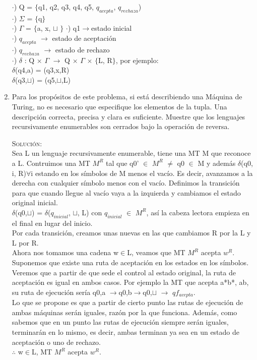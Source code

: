 \documentclass[letterpaper,10pt]{article}
\begin{document}
\begin{enumerate}
	$\cdot$) Q = $\lbrace$q1, q2, q3, q4, q5, $q_{acepta}$, $q_{rechaza}$)\\
	$\cdot$) $\Sigma$ = $\lbrace$q$\rbrace$\\
	$\cdot$) $\Gamma$ = $\lbrace$a, x, $\sqcup$ $\rbrace$
	$\cdot$) q1$\rightarrow$estado inicial\\
	$\cdot$) $q_{acepta}$ $\rightarrow$ estado de aceptación\\
	$\cdot$)  $q_{rechaza}$ $\rightarrow$ estado de rechazo\\
	$\cdot$) $\delta$ : Q $\times$ $\Gamma$ $\rightarrow$ Q $\times$ $\Gamma$ $\times$ $\lbrace$L, R$\rbrace$, por ejemplo:\\
	$\delta$(q4,a) = (q3,x,R)\\
	$\delta$(q3,$\sqcup$) = (q5,$\sqcup$,L)
	
	
    \item Para los propósitos de este problema, si está describiendo una Máquina de Turing, no
es necesario que especifique los elementos de la tupla. Una descripción correcta, precisa y clara es
suficiente. Muestre que los lenguajes recursivamente enumerables son cerrados bajo la operación de
reversa.

    \textsc{Solución:}
    \\
    Sea L un lenguaje recursivamente enumerable, tiene una MT M que reconoce a L. Contruimos una MT $M^{R}$ tal que q0' $\in$ $M^{R}$ $\neq$ q0 $\in$ M y además $\delta$(q0, i, R)$\forall$i estando en los símbolos de M menos el vacío. Es decir, avanzamos a la derecha con cualquier símbolo menos con el vacío.
    Definimos la transición para que cuando llegue al vacío vaya a la izquierda y cambiamos el estado original inicial.\\
    $\delta$(q0,$\sqcup$) = $\delta$($q_{inicial}$, $\sqcup$, L) con $q_{inicial}$ $\in$ $M^{R}$, así la cabeza lectora empieza en el final en lugar del inicio.\\
    Por cada transición, creamos unas nuevas en las que cambiamos R por la L y L por R.\\
    Ahora nos tomamos una cadena w$\in$L, veamos que MT $M^{R}$ acepta $w^{R}$. Suponemos que existe una ruta de aceptación en los estados en los símbolos. Veremos que a partir de que sede el control al estado original, la ruta de aceptación es igual en ambos casos. Por ejemplo la MT que acepta a*b*, ab, su ruta de ejecución sería q0,a $\rightarrow$q0,b$\rightarrow$q0,$\sqcup$ $\rightarrow$ $qf_{acepta}$.\\
    Lo que se propone es que a partir de cierto punto las rutas de ejecución de ambas máquinas serán iguales, razón por la que funciona. Además, como sabemos que en un punto las rutas de ejecución siempre serán iguales, terminarán en lo mismo, es decir, ambas terminan ya sea en un estado de aceptación o uno de rechazo.\\
    $\therefore$ w$\in$L, MT $M^{R}$ acepta $w^{R}$.
    

\end{enumerate}
\end{document}

